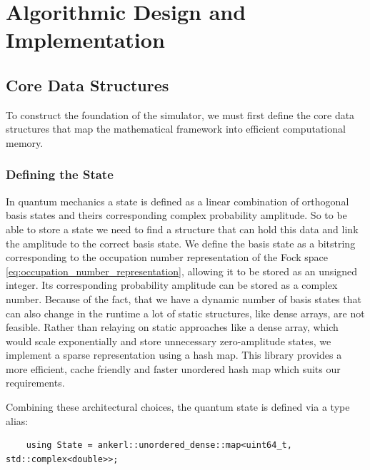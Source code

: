 \chapter{Algorithmic Design and Implementation}
\label{c:algorithmic-impl}


\section{Core Data Structures}
To construct the foundation of the simulator, we must first define the core data structures that map the mathematical framework into efficient computational memory.

\subsection{Defining the State}
In quantum mechanics a state is defined as a linear combination of orthogonal basis states and theirs corresponding complex probability amplitude.
So to be able to store a state we need to find a structure that can hold this data and link the amplitude to the correct basis state.
We define the basis state as a bitstring corresponding to the occupation number representation of the Fock space \eqref{eq:occupation_number_representation}, allowing it to be stored as an unsigned integer.
Its corresponding probability amplitude can be stored as a complex number.
\cite[Ch. 1.2.1]{sakurai2020modern}
Because of the fact, that we have a dynamic number of basis states that can also change in the runtime a lot of static structures, like dense arrays, are not feasible.
Rather than relaying on static approaches like a dense array, which would scale exponentially and store unnecessary zero-amplitude states, we implement a sparse representation using a hash map.
This library provides a more efficient, cache friendly and faster unordered hash map which suits our requirements.
\cite{ankerl_unordered_dense}


Combining these architectural choices, the quantum state is defined via a type alias:
\begin{verbatim}
    using State = ankerl::unordered_dense::map<uint64_t, std::complex<double>>;
\end{verbatim}

